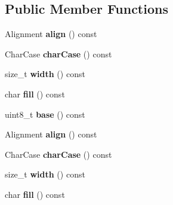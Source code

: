 \subsection*{Public Member Functions}
\begin{DoxyCompactItemize}
\item 
Alignment {\bfseries align} () const \hypertarget{classgxx_1_1io_1_1EmptySpec_aea647109fcd983c2dd48a5dd55e768fa}{}\label{classgxx_1_1io_1_1EmptySpec_aea647109fcd983c2dd48a5dd55e768fa}

\item 
Char\+Case {\bfseries char\+Case} () const \hypertarget{classgxx_1_1io_1_1EmptySpec_ac81567b47cbfcf4d96e8d3044f48ccd5}{}\label{classgxx_1_1io_1_1EmptySpec_ac81567b47cbfcf4d96e8d3044f48ccd5}

\item 
size\+\_\+t {\bfseries width} () const \hypertarget{classgxx_1_1io_1_1EmptySpec_a4ca4033e8409d934c762f5c8c6c13a46}{}\label{classgxx_1_1io_1_1EmptySpec_a4ca4033e8409d934c762f5c8c6c13a46}

\item 
char {\bfseries fill} () const \hypertarget{classgxx_1_1io_1_1EmptySpec_aa5f6882502c0bb1b73785029c4a54072}{}\label{classgxx_1_1io_1_1EmptySpec_aa5f6882502c0bb1b73785029c4a54072}

\item 
uint8\+\_\+t {\bfseries base} () const \hypertarget{classgxx_1_1io_1_1EmptySpec_ad9da604f2910a176e53ba009d0f9fc98}{}\label{classgxx_1_1io_1_1EmptySpec_ad9da604f2910a176e53ba009d0f9fc98}

\item 
Alignment {\bfseries align} () const \hypertarget{classgxx_1_1io_1_1EmptySpec_aea647109fcd983c2dd48a5dd55e768fa}{}\label{classgxx_1_1io_1_1EmptySpec_aea647109fcd983c2dd48a5dd55e768fa}

\item 
Char\+Case {\bfseries char\+Case} () const \hypertarget{classgxx_1_1io_1_1EmptySpec_ac81567b47cbfcf4d96e8d3044f48ccd5}{}\label{classgxx_1_1io_1_1EmptySpec_ac81567b47cbfcf4d96e8d3044f48ccd5}

\item 
size\+\_\+t {\bfseries width} () const \hypertarget{classgxx_1_1io_1_1EmptySpec_a4ca4033e8409d934c762f5c8c6c13a46}{}\label{classgxx_1_1io_1_1EmptySpec_a4ca4033e8409d934c762f5c8c6c13a46}

\item 
char {\bfseries fill} () const \hypertarget{classgxx_1_1io_1_1EmptySpec_aa5f6882502c0bb1b73785029c4a54072}{}\label{classgxx_1_1io_1_1EmptySpec_aa5f6882502c0bb1b73785029c4a54072}


\end{DoxyCompactItemize}
